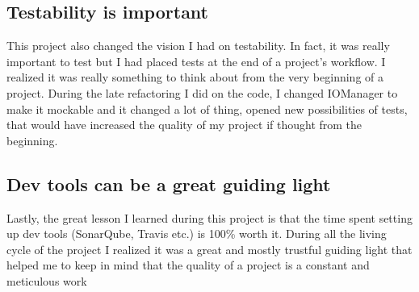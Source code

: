 \documentclass[11pt]{article}
\begin{document}
\subsection{Testability is important}
This project also changed the vision I had on testability. In fact, it was really important to test but I had placed tests at the end of a project's workflow. I realized it was really something to think about from the very beginning of a project. During the late refactoring I did on the code, I changed IOManager to make it mockable and it changed a lot of thing, opened new possibilities of tests, that would have increased the quality of my project if thought from the beginning.

\subsection{Dev tools can be a great guiding light}
Lastly, the great lesson I learned during this project is that the time spent setting up dev tools (SonarQube, Travis etc.) is 100\% worth it. During all the living cycle of the project I realized it was a great and mostly trustful guiding light that helped me to keep in mind that the quality of a project is a constant and meticulous work
\end{document}
